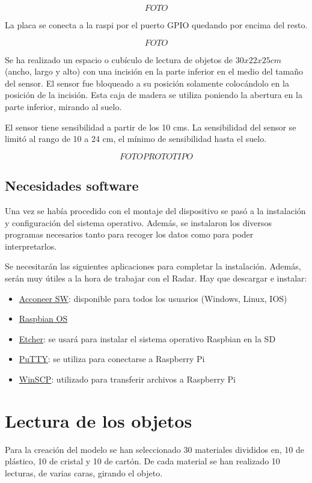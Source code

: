 $$FOTO$$

La placa se conecta a la raspi por el puerto GPIO quedando por encima del resto.

$$FOTO$$


Se ha realizado un espacio o cubículo de lectura de objetos de $30x22x25 cm$ (ancho, largo y alto) con una incisión en la parte inferior en el medio del tamaño del sensor. El sensor fue bloqueado a su posición solamente colocándolo en la posición de la incisión. Esta caja de madera se utiliza poniendo la abertura en la parte inferior, mirando al suelo.
 
El sensor tiene sensibilidad a partir de los 10 cms. La sensibilidad del sensor se limitó al rango de 10 a 24 cm, el mínimo de sensibilidad hasta el suelo.

$$FOTO PROTOTIPO$$

\subsection{Necesidades software}

Una vez se había procedido con el montaje del dispositivo se pasó a la instalación y configuración del sistema operativo. Además, se instalaron los diversos programas necesarios tanto para recoger los datos como para poder interpretarlos.

Se necesitarán las siguientes aplicaciones para completar la instalación. Además, serán muy útiles a la hora de trabajar con el Radar. 
Hay que descargar e instalar: 
\begin{itemize}
\item \href{http://developer.acconeer.com}{Acconeer SW}: disponible para todos los usuarios (Windows, Linux, IOS) 
\item \href{www.raspberrypi.org}{Raspbian OS} 
\item \href{http://www.etcher.io}{Etcher}: se usará para instalar el sistema operativo Raspbian en la SD
\item 
\href{http://www.putty.org}{PuTTY}: se utiliza para conectarse a Raspberry Pi
\item \href{http://www.winscp.net}{WinSCP}: utilizado para transferir archivos a Raspberry Pi
\end{itemize}
 
\section{Lectura de los objetos}

Para la creación del modelo se han seleccionado 30 materiales divididos en, 10 de plástico, 10 de cristal y 10 de cartón. De cada material se han realizado 10 lecturas, de varias caras, girando el objeto.

